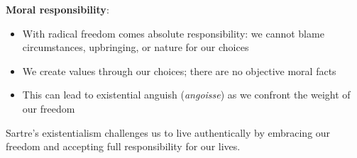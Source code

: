 \documentclass[11pt]{article}
\begin{document}
\begin{enumerate}[label=\textbf{\arabic*.}]
  \textbf{Moral responsibility}:
  \begin{itemize}
    \item With radical freedom comes absolute responsibility: we cannot blame circumstances, upbringing, 
    or nature for our choices
    \item We create values through our choices; there are no objective moral facts
    \item This can lead to existential anguish (\textit{angoisse}) as we confront the weight of 
    our freedom
  \end{itemize}

  Sartre's existentialism challenges us to live authentically by embracing our freedom and accepting 
  full responsibility for our lives.

\end{enumerate}
\end{document}
